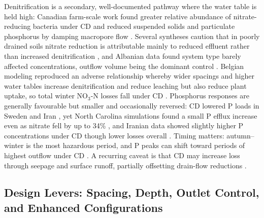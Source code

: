 \documentclass[11pt]{article}
\begin{document}
Denitrification is a secondary, well-documented pathway where the water table is
held high: Canadian farm-scale work found greater relative abundance of
nitrate-reducing bacteria under CD and reduced suspended solids and particulate
phosphorus by damping macropore flow \parencite{Tanga2025}. Several syntheses
caution that in poorly drained soils nitrate reduction is attributable mainly to
reduced effluent rather than increased denitrification \parencite{THOMAS1995},
and Albanian data found system type barely affected concentrations, outflow
volume being the dominant control \parencite{Grazhdani1996}. Belgian modeling
reproduced an adverse relationship whereby wider spacings and higher water tables
increase denitrification and reduce leaching but also reduce plant uptake, so
total winter NO$_3$-N losses fall under CD \parencite{ElSadek2002,ElSadek2002b}.
Phosphorus responses are generally favourable but smaller and occasionally
reversed: CD lowered P loads in Sweden and Iran
\parencite{Wesström2007,Wesström2001,Jouni2018}, yet North Carolina simulations
found a small P efflux increase even as nitrate fell by up to 34\%
\parencite{DEAL1986}, and Iranian data showed slightly higher P concentrations
under CD though lower losses overall \parencite{Jouni2018}. Timing matters:
autumn--winter is the most hazardous period, and P peaks can shift toward periods
of highest outflow under CD \parencite{Tolomio2018,Wesström2007}. A recurring
caveat is that CD may increase loss through seepage and surface runoff, partially
offsetting drain-flow reductions \parencite{Frankenberger2024}.

\subsection{Design Levers: Spacing, Depth, Outlet Control, and Enhanced Configurations}
\end{document}
